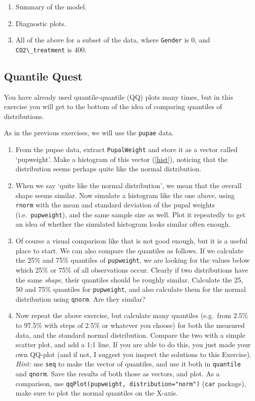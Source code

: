 \documentclass[]{book}
\begin{document}
\begin{enumerate}
\def\labelenumi{\arabic{enumi}.}
\item
  Summary of the model.
\item
  Diagnostic plots.
\item
  All of the above for a subset of the data, where \texttt{Gender} is 0, and \texttt{CO2\textbackslash{}\_treatment} is 400.
\end{enumerate}

\hypertarget{quantile-quest}{%
\subsection{Quantile Quest}\label{quantile-quest}}

You have already used quantile-quantile (QQ) plots many times, but in this exercise you will get to the bottom of the idea of comparing quantiles of distributions.

As in the previous exercises, we will use the \texttt{pupae} data.

\begin{enumerate}
\def\labelenumi{\arabic{enumi}.}
\item
  From the pupae data, extract \texttt{PupalWeight} and store it as a vector called `pupweight'. Make a histogram of this vector (\ref{hist}), noticing that the distribution seems perhaps quite like the normal distribution.
\item
  When we say `quite like the normal distribution', we mean that the overall shape seems similar. Now simulate a histogram like the one above, using \texttt{rnorm} with the mean and standard deviation of the pupal weights (i.e.~\texttt{pupweight}), and the same sample size as well. Plot it repeatedly to get an idea of whether the simulated histogram looks similar often enough.
\item
  Of course a visual comparison like that is not good enough, but it is a useful place to start. We can also compare the quantiles as follows. If we calculate the 25\% and 75\% quantiles of \texttt{pupweight}, we are looking for the values below which 25\% or 75\% of all observations occur. Clearly if two distributions have the same \emph{shape}, their quantiles should be roughly similar. Calculate the 25, 50 and 75\% quantiles for \texttt{pupweight}, and also calculate them for the normal distribution using \texttt{qnorm}. Are they similar?
\item
  Now repeat the above exercise, but calculate many quantiles (e.g.~from 2.5\% to 97.5\% with steps of 2.5\% or whatever you choose) for both the measured data, and the standard normal distribution. Compare the two with a simple scatter plot, and add a 1:1 line. If you are able to do this, you just made your own QQ-plot (and if not, I suggest you inspect the solutions to this Exercise). \emph{Hint:} use \texttt{seq} to make the vector of quantiles, and use it both in \texttt{quantile} and \texttt{qnorm}. Save the results of both those as vectors, and plot. As a comparison, use \texttt{qqPlot(pupweight,\ distribution="norm")} (\texttt{car} package), make sure to plot the normal quantiles on the X-axis.
\end{enumerate}
\end{document}
